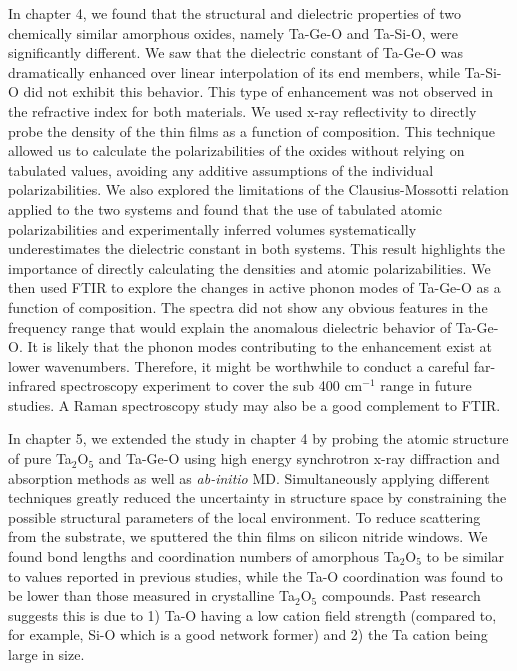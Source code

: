 In chapter 4, we found that the structural and dielectric properties of two chemically similar amorphous oxides, namely Ta-Ge-O and Ta-Si-O, were significantly different. We saw that the dielectric constant of Ta-Ge-O was dramatically enhanced over linear interpolation of its end members, while Ta-Si-O did not exhibit this behavior. This type of enhancement was not observed in the refractive index for both materials. We used x-ray reflectivity to directly probe the density of the thin films as a function of composition. This technique allowed us to calculate the polarizabilities of the oxides without relying on tabulated values, avoiding any additive assumptions of the individual polarizabilities. We also explored the limitations of the Clausius-Mossotti relation applied to the two systems and found that the use of tabulated atomic polarizabilities and experimentally inferred volumes systematically underestimates the dielectric constant in both systems. This result highlights the importance of directly calculating the densities and atomic polarizabilities. We then used FTIR to explore the changes in active phonon modes of Ta-Ge-O as a function of composition. The spectra did not show any obvious features in the frequency range that would explain the anomalous dielectric behavior of Ta-Ge-O. It is likely that the phonon modes contributing to the enhancement exist at lower wavenumbers. Therefore, it might be worthwhile to conduct a careful far-infrared spectroscopy experiment to cover the sub 400 cm$^{-1}$ range in future studies. A Raman spectroscopy study may also be a good complement to FTIR. 

In chapter 5, we extended the study in chapter 4 by probing the atomic structure of pure Ta$_{2}$O$_{5}$ and Ta-Ge-O using high energy synchrotron x-ray diffraction and absorption methods as well as \emph{ab-initio} MD. Simultaneously applying different techniques greatly reduced the uncertainty in structure space by constraining the possible structural parameters of the local environment. To reduce scattering from the substrate, we sputtered the thin films on silicon nitride windows. We found bond lengths and coordination numbers of amorphous Ta$_{2}$O$_{5}$ to be similar to values reported in previous studies, while the Ta-O coordination was found to be lower than those measured in crystalline Ta$_{2}$O$_{5}$ compounds. Past research suggests this is due to 1) Ta-O having a low cation field strength (compared to, for example, Si-O which is a good network former) and 2) the Ta cation being large in size. 

